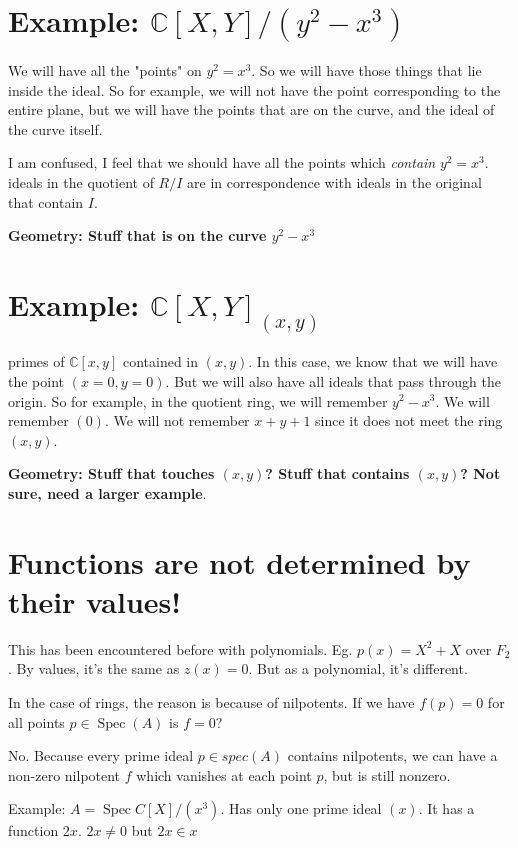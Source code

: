 \documentclass{book}
\newcommand{\C}{\ensuremath{\mathbb{C}}}
\newcommand{\spec}{\operatorname{Spec}}
\theoremstyle{definition}
\begin{document}
\section{Example: $\C[X, Y]/(y^2 - x^3)$}

We will have all the "points" on $y^2 = x^3$. So we will have those things
that lie inside the ideal. So for example, we will not have the point
corresponding to the entire plane, but we will have the points that are
on the curve, and the ideal of the curve itself.

I am confused, I feel that we should have all the points which \emph{contain} $y^2 = x^3$.
ideals in the quotient of $R/I$ are in correspondence with ideals in the original that
contain $I$.

\textbf{Geometry: Stuff that is on the curve $y^2 - x^3$}


\section{Example: $\C[X, Y]_(x, y)$}

primes of $\C[x, y]$ contained in $(x, y)$. In this case, we know that we will
have the point $(x=0, y=0)$. But we will also have all ideals that pass through
the origin. So for example, in the quotient ring, we will remember $y^2 - x^3$.
We will remember $(0)$. We will not remember $x + y + 1$ since it does not
meet the ring $(x, y)$.


\textbf{Geometry: Stuff that touches $(x, y)$? Stuff that contains $(x, y)$? Not sure, need a larger example}.

\section{Functions are not determined by their values!}

This has been encountered before with
polynomials. Eg. $p(x) = X^2 + X$ over $F_2$. By values, it's the same
as $z(x) = 0$. But as a polynomial, it's different.

In the case of rings, the reason is because of nilpotents. If we have
$f(p) = 0$ for all points $p \in \spec(A)$ is $f = 0$? 

No. Because every prime ideal $p \in spec(A)$ contains nilpotents,
we can have a non-zero nilpotent $f$ which vanishes at each point $p$,
but is still nonzero.

Example: $A = \spec C[X]/(x^3)$. Has only one prime ideal $(x)$. It has 
a function $2x$. $2x \neq 0$ but $2x \in x$
\end{document}
